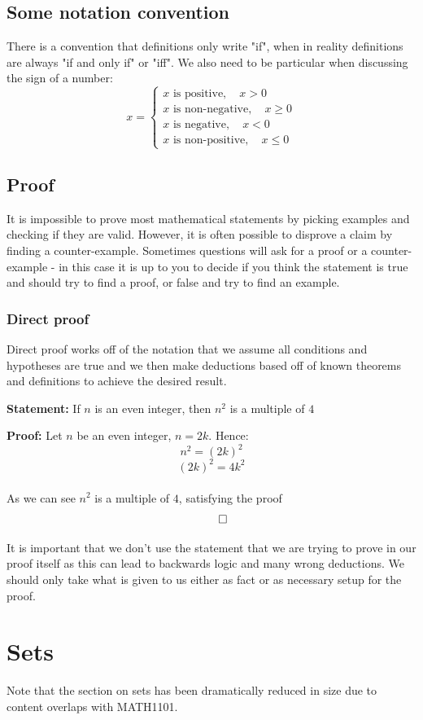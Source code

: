 \documentclass[12pt]{article}
\begin{document}
\subsection*{Some notation convention}
There is a convention that definitions only write "if", when in reality definitions are always "if and only if" or "iff". We also need to be particular when discussing the sign of a number:
\[x = \begin{cases}
x\text{ is positive},\quad x>0 \\
x\text{ is non-negative},\quad x\geq0 \\
x\text{ is negative},\quad x<0 \\
x\text{ is non-positive},\quad x\leq0
\end{cases}\]
\subsection*{Proof}
It is impossible to prove most mathematical statements by picking examples and checking if they are valid. However, it is often possible to disprove a claim by finding a counter-example. Sometimes questions will ask for a proof or a counter-example - in this case it is up to you to decide if you think the statement is true and should try to find a proof, or false and try to find an example.
\subsubsection*{Direct proof}
Direct proof works off of the notation that we assume all conditions and hypotheses are true and we then make deductions based off of known theorems and definitions to achieve the desired result.

\textbf{Statement:} If \(n\) is an even integer, then \(n^2\) is a multiple of \(4\)

\textbf{Proof:}
Let \(n\) be an even integer, \(n=2k\). Hence:
\[n^2=(2k)^2\]
\[(2k)^2=4k^2\]
\\As we can see \(n^2\) is a multiple of \(4\), satisfying the proof
\[\qed\]

It is important that we don't use the statement that we are trying to prove in our proof itself as this can lead to backwards logic and many wrong deductions. We should only take what is given to us either as fact or as necessary setup for the proof.
\section{Sets}
Note that the section on sets has been dramatically reduced in size due to content overlaps with MATH1101.
\end{document}

